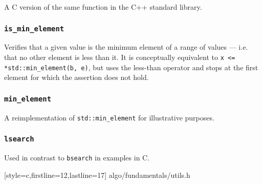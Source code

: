 A C version of the same function in the C++ standard library.


\vspace{-\baselineskip}

\subsubsection{\texttt{is\_min\_element}}

Verifies that a given value is the minimum element of a range of values --- i.e.
that no other element is less than it.  It is conceptually equivalent to
\texttt{x <= *std::min\_element(b, e)}, but uses the less-than operator and
stops at the first element for which the assertion does not hold.


\vspace{-\baselineskip}

\subsubsection{\texttt{min\_element}}

A reimplementation of \texttt{std::min\_element} for illustrative purposes.


\vspace{-\baselineskip}

\subsubsection{\texttt{lsearch}}

Used in contrast to \texttt{bsearch} in examples in C.


    [style=c,firstline=12,lastline=17]
    {algo/fundamentals/utils.h}
\vspace{-\baselineskip}
